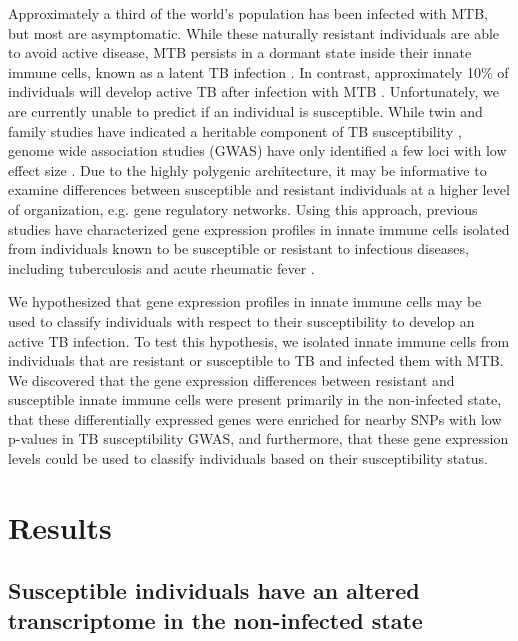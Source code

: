Approximately a third of the world's population has been infected with
MTB, but most are asymptomatic. While these naturally resistant
individuals are able to avoid active disease, MTB persists in a
dormant state inside their innate immune cells, known as a latent TB
infection \citep{Munoz2015}. In contrast, approximately 10\% of
individuals will develop active TB after infection with MTB
\citep{North2004, OGarra2013}. Unfortunately, we are currently unable
to predict if an individual is susceptible. While twin and family
studies have indicated a heritable component of TB susceptibility
\citep{Kallmann1943, Comstock1978, Cobat2010, Moller2010}, genome wide
association studies (GWAS) have only identified a few loci with low
effect size \citep{Thye2010, Mahasirimongkol2012, Thye2012, Png2012,
Chimusa2014, Curtis2015, Sobota2016}. Due to the highly polygenic
architecture, it may be informative to examine differences between
susceptible and resistant individuals at a higher level of
organization, e.g. gene regulatory networks. Using this approach,
previous studies have characterized gene expression profiles in innate
immune cells isolated from individuals known to be susceptible or
resistant to infectious diseases, including tuberculosis
\citep{Thuong2008} and acute rheumatic fever \citep{Bryant2014}.

We hypothesized that gene expression profiles in innate immune cells
may be used to classify individuals with respect to their
susceptibility to develop an active TB infection. To test this
hypothesis, we isolated innate immune cells from individuals that are
resistant or susceptible to TB and infected them with MTB. We
discovered that the gene expression differences between resistant and
susceptible innate immune cells were present primarily in the
non-infected state, that these differentially expressed genes were
enriched for nearby SNPs with low p-values in TB susceptibility GWAS,
and furthermore, that these gene expression levels could be used to
classify individuals based on their susceptibility status.

\section{Results}

\subsection{Susceptible individuals have an altered transcriptome in the non-infected state}

